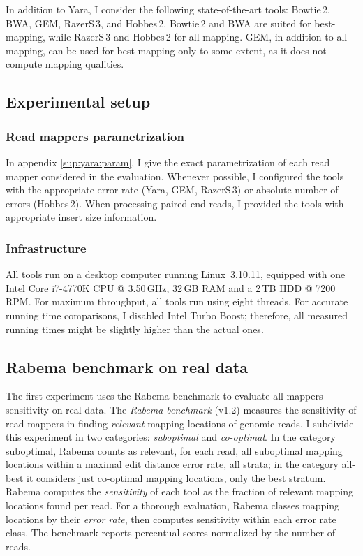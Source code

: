 In addition to Yara, I consider the following state-of-the-art tools: Bowtie\,2, BWA, GEM, RazerS\,3, and Hobbes\,2.
Bowtie\,2 and BWA are suited for best-mapping, while RazerS\,3 and Hobbes\,2 for all-mapping.
GEM, in addition to all-mapping, can be used for best-mapping only to some extent, as it does not compute mapping qualities.

\subsection{Experimental setup}

\subsubsection{Read mappers parametrization}

In appendix \ref{sup:yara:param}, I give the exact parametrization of each read mapper considered in the evaluation.
Whenever possible, I configured the tools with the appropriate error rate (Yara, GEM, RazerS\,3) or absolute number of errors (Hobbes\,2).
When processing paired-end reads, I provided the tools with appropriate insert size information.

\subsubsection{Infrastructure}

All tools run on a desktop computer running Linux~3.10.11, equipped with one Intel\textsuperscript{\textregistered} Core i7-4770K CPU @ 3.50\,GHz, 32\,GB RAM and a 2\,TB HDD @ 7200\,RPM.
For maximum throughput, all tools run using eight threads.
For accurate running time comparisons, I disabled Intel Turbo Boost; therefore, all measured running times might be slightly higher than the actual ones.

\subsection{Rabema benchmark on real data}
\label{sec:yara:eval:rabema}

The first experiment uses the Rabema benchmark to evaluate all-mappers sensitivity on real data.
The \emph{Rabema benchmark} \citep{Holtgrewe2011} (v1.2) measures the sensitivity of read mappers in finding \emph{relevant} mapping locations of genomic reads.
I subdivide this experiment in two categories: \emph{suboptimal} and \emph{co-optimal}.
In the category suboptimal, Rabema counts as relevant, for each read, all suboptimal mapping locations within a maximal edit distance error rate, \ie all strata; in the category all-best it considers just co-optimal mapping locations, \ie only the best stratum.
Rabema computes the \emph{sensitivity} of each tool as the fraction of relevant mapping locations found per read.
For a thorough evaluation, Rabema classes mapping locations by their \emph{error rate}, then computes sensitivity within each error rate class.
The benchmark reports percentual scores normalized by the number of reads.

